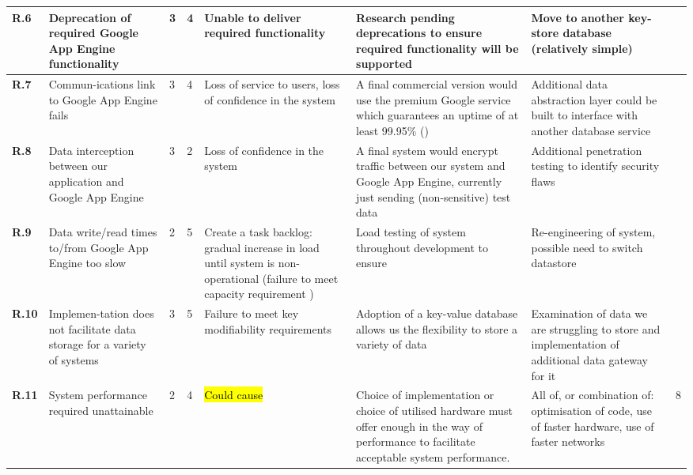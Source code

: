 \begin{longtable}[H]{| p{0.65cm} | p{2cm} | p{0.3cm} | p{0.3cm} | p{2.4cm} | p{3cm} | p{2.7cm} | p{0.4cm} |}
  \hline \textbf{R.6}
  & Deprecation of required Google App Engine functionality
  & 3
  & 4
  & Unable to deliver required functionality
  & Research pending deprecations to ensure required functionality will be supported
  & Move to another key-store database (relatively simple)
  & \\
  
  
  \hline \textbf{R.7}
  & Commun-ications link to Google App Engine fails
  & 3
  & 4
  & Loss of service to users, loss of confidence in the system
  & A final commercial version would use the premium Google service which guarantees an uptime of at least 99.95\% (\nfrit10)
  & Additional data abstraction layer could be built to interface with another database service
  & \\
  
  \hline \textbf{R.8}
  & Data interception between our application and Google App Engine 
  & 3
  & 2
  & Loss of confidence in the system
  & A final system would encrypt traffic between our system and Google App Engine, currently just sending (non-sensitive) test data
  & Additional penetration testing to identify security flaws
  & \\
  
  \hline \textbf{R.9}
  & Data write/read times to/from Google App Engine too slow
  & 2
  & 5
  & Create a task backlog: gradual increase in load until system
  is non-operational (failure to meet capacity requirement \nfrit9)
  & Load testing of system throughout development to ensure \nfrit9
  & Re-engineering of system, possible need to switch datastore
  & \\
  
  \hline \textbf{R.10}
  & Implemen-tation does not facilitate data storage for a variety of systems
  & 3
  & 5
  & Failure to meet key modifiability requirements 
  & Adoption of a key-value database allows us the flexibility to store a variety of data
  & Examination of data we are struggling to store and implementation of additional data gateway for it
  & \\  
  
  \hline \textbf{R.11}
  & System performance required unattainable
  & 2
  & 4
  & \hl{Could cause }
  & Choice of implementation or choice of utilised hardware must offer
  enough in the way of performance to facilitate acceptable system
  performance.
  & All of, or combination of: optimisation of code, use of faster
  hardware, use of faster networks
  & 8 \\    
  

\end{longtable}
